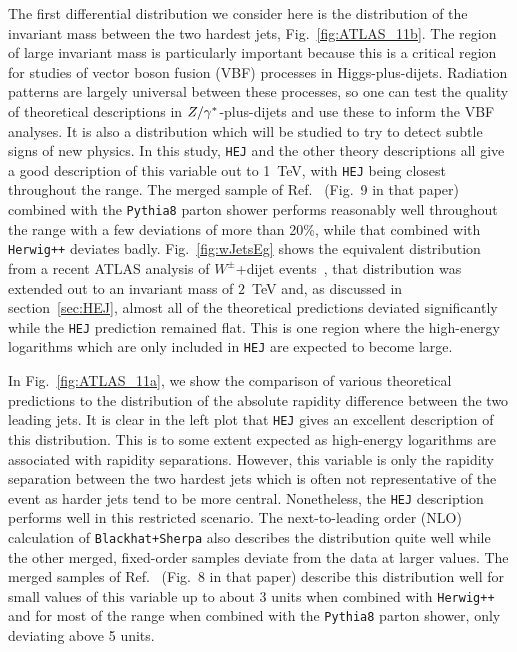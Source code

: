 		The first differential distribution we consider here is the distribution of the
		invariant mass between the two hardest jets, Fig.~\eqref{fig:ATLAS_11b}.  The
		region of large invariant mass is particularly important because this is a
		critical region for studies of vector boson fusion (VBF) processes in
		Higgs-plus-dijets.  Radiation patterns are largely universal between these
		processes, so one can test the quality of theoretical descriptions in
		$Z/\gamma^*$-plus-dijets and use these to inform the VBF analyses.  It is also a
		distribution which will be studied to try to detect subtle signs of new physics.
		In this study, \texttt{HEJ} and the other theory descriptions all give a good description
		of this variable out to 1~TeV, with \texttt{HEJ} being closest throughout the range.  The
		merged sample of Ref.~\cite{Frederix:2015eii} (Fig.~9 in that paper) combined
		with the \texttt{Pythia8} parton shower performs reasonably well throughout the range
		with a few deviations of more than 20\%, while that combined with \texttt{Herwig++}
		deviates badly.  Fig.~\eqref{fig:wJetsEg} shows the equivalent distribution from
		a recent ATLAS analysis of $W^\pm$+dijet events~\cite{Aad:2014qxa}, that distribution
		was extended out to an invariant mass of $2$~TeV and, as discussed in section~\ref{sec:HEJ},
		almost all of the theoretical predictions deviated significantly while the \texttt{HEJ}
		prediction remained flat.  This is one region where the high-energy logarithms
		which are only included in \texttt{HEJ} are expected to become large.

		In Fig.~\eqref{fig:ATLAS_11a}, we show the comparison of various theoretical
		predictions to the distribution of the absolute rapidity difference between the
		two leading jets.  It is clear in the left plot that \texttt{HEJ} gives an excellent
		description of this distribution.  This is to some extent expected as
		high-energy logarithms are associated with rapidity separations.  However, this
		variable is only the rapidity separation between the two hardest jets which is
		often not representative of the event as harder jets tend to be more central.
		Nonetheless, the \texttt{HEJ} description performs well in this restricted scenario.  The
		next-to-leading order (NLO) calculation of \texttt{Blackhat+Sherpa} also describes the
		distribution quite well while the other merged, fixed-order samples deviate from
		the data at larger values.  The merged samples of Ref.~\cite{Frederix:2015eii}
		(Fig.~8 in that paper) describe this distribution well for small values of this
		variable up to about 3 units when combined with \texttt{Herwig++} and for most of the
		range when combined with the \texttt{Pythia8} parton shower, only deviating above 5 units.

